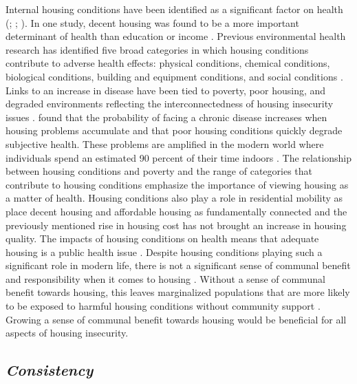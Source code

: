 Internal housing conditions have been identified as a significant factor on health (\citealp{braveman_housing_2011}; \citealp{metzger_fair_2017}; \citealp{swope_housing_2020}). In one study, decent housing was found to be a more important determinant of health than education or income \citep{angel_housing_2014}. Previous environmental health research has identified five broad categories in which housing conditions contribute to adverse health effects: physical conditions, chemical conditions, biological conditions, building and equipment conditions, and social conditions \citep{jacobs_environmental_2011}. Links to an increase in disease have been tied to poverty, poor housing, and degraded environments reflecting the interconnectedness of housing insecurity issues \citep{rauh_housing_2008}.  \citet{angel_housing_2014} found that the probability of facing a chronic disease increases when housing problems accumulate and that poor housing conditions quickly degrade subjective health. These problems are amplified in the modern world where individuals spend an estimated 90 percent of their time indoors \citep{palacios_impact_2021}. The relationship between housing conditions and poverty and the range of categories that contribute to housing conditions emphasize the importance of viewing housing as a matter of health. Housing conditions also play a role in residential mobility as \citet{desmond_housing_2015} place decent housing and affordable housing as fundamentally connected and the previously mentioned rise in housing cost has not brought an increase in housing quality. The impacts of housing conditions on health means that adequate housing is a public health issue \citep{matte_housing_2000}. Despite housing conditions playing such a significant role in modern life, there is not a significant sense of communal benefit and responsibility when it comes to housing \citep{jacobs_environmental_2011}.  Without a sense of communal benefit towards housing, this leaves marginalized populations that are more likely to be exposed to harmful housing conditions without community support \citep{swope_housing_2020}. Growing a sense of communal benefit towards housing would be beneficial for all aspects of housing insecurity. 

\subsection{\textit{Consistency}} 


